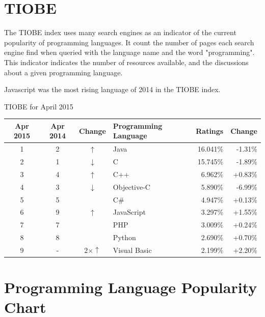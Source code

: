 \section{TIOBE}

The TIOBE index uses many search engines as an indicator of the current popularity of programming languages.
It count the number of pages each search engine find when queried with the language name and the word "programming".
This indicator indicates the number of resources available, and the discussions about a given programming language.

Javascript was the most rising language of 2014 in the TIOBE index.

TIOBE for April 2015\\
\begin{tabular}{c c c l r r}
Apr 2015 & Apr 2014 & Change           & Programming Language & Ratings  & Change  \\ \hline
1        & 2        & $\uparrow$       & Java                 & 16.041\% & -1.31\%  \\ \hline
2        & 1        & $\downarrow$     & C                    & 15.745\% & -1.89\%  \\ \hline
3        & 4        & $\uparrow$       & C++                  & 6.962\%  & +0.83\%  \\ \hline
4        & 3        & $\downarrow$     & Objective-C          & 5.890\%  & -6.99\%  \\ \hline
5        & 5        &                  & C\#                  & 4.947\%  & +0.13\%  \\ \hline
6        & 9        & $\uparrow$       & JavaScript           & 3.297\%  & +1.55\%  \\ \hline
7        & 7        &                  & PHP                  & 3.009\%  & +0.24\%  \\ \hline
8        & 8        &                  & Python               & 2.690\%  & +0.70\%  \\ \hline
9        & -        & $2\times\uparrow$ & Visual Basic        & 2.199\%  & +2.20\%  \\ \hline
\end{tabular}



\section{Programming Language Popularity Chart}

